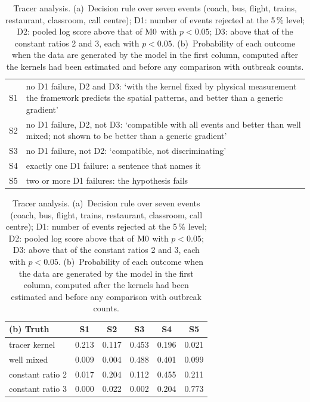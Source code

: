 \begin{table}[tbp]
  \centering\footnotesize
  \caption{Tracer analysis. (a)~Decision rule over seven events (coach, bus, flight, trains, restaurant,
  classroom, call centre); D1: number of events rejected at the 5\,\% level; D2: pooled log score above that of
  $\mathrm{M0}$ with $p<0.05$; D3: above that of the constant ratios 2 and 3, each with $p<0.05$. (b)~Probability of
  each outcome when the data are generated by the model in the first column, computed after the kernels had
  been estimated and before any comparison with outbreak counts.}
  \label{appS_prot2:tab:tracerrule}
  \begin{tabular}{@{}l>{\raggedright\arraybackslash}p{}@{}}
    \toprule
    S1 & no D1 failure, D2 and D3: `with the kernel fixed by physical measurement the framework predicts the
         spatial patterns, and better than a generic gradient' \\
    S2 & no D1 failure, D2, not D3: `compatible with all events and better than well mixed; not shown to be
         better than a generic gradient' \\
    S3 & no D1 failure, not D2: `compatible, not discriminating' \\
    S4 & exactly one D1 failure: a sentence that names it \\
    S5 & two or more D1 failures: the hypothesis fails \\
    \bottomrule
  \end{tabular}

  \medskip
  \begin{tabular}{@{}lccccc@{}}
    \toprule
    (b) Truth & S1 & S2 & S3 & S4 & S5 \\
    \midrule
    tracer kernel     & 0.213 & 0.117 & 0.453 & 0.196 & 0.021 \\
    well mixed        & 0.009 & 0.004 & 0.488 & 0.401 & 0.099 \\
    constant ratio 2  & 0.017 & 0.204 & 0.112 & 0.455 & 0.211 \\
    constant ratio 3  & 0.000 & 0.022 & 0.002 & 0.204 & 0.773 \\
    \bottomrule
  \end{tabular}
\end{table}

